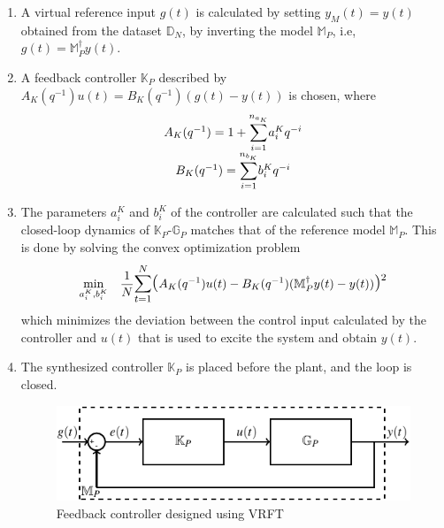 \documentclass[letterpaper, 10 pt, conference]{ieeeconf}  %
\begin{document}
\begin{enumerate}
	\item
	A virtual reference input $g(t)$ is calculated by setting $y_M(t)=y(t)$ obtained from the dataset $\mathbb{D}_N$, by inverting the model $\mathbb{M}_P$, i.e, $g(t) = \mathbb{M}_P^{\dagger}y(t) $.
	\item
	A feedback controller $\mathbb{K}_P$ described by $A_K(q^{-1})u(t) = B_K(q^{-1})(g(t)-y(t))$ is chosen, where 
	\begin{equation*}
	\begin{matrix}
	A_K(q^{-1}) = 1+\mathlarger{\sum\limits_{i=1}^{n_{a_K}}}a_i^Kq^{-i}\\
	B_K(q^{-1}) = \mathlarger{\sum\limits_{i=1}^{n_{b_K}}}b_i^Kq^{-i}
	\end{matrix}  
	\end{equation*}
	\item
		The parameters $a_i^K$ and $b_i^K$  of the controller are calculated such that the closed-loop dynamics of $\mathbb{K}_P$-$\mathbb{G}_P$ matches that of  the reference model $\mathbb{M}_P$.
	This is done by solving the convex optimization problem
	\begin{equation}
	\begin{aligned}
	& \underset{a_i^K,b_i^K}{\text{min}}
	& & \frac{1}{N}\mathlarger{\sum\limits_{t=1}^N}\mathlarger{\mathlarger{(}}A_K(q^{-1})u(t)-B_K(q^{-1})(\mathbb{M}_P^{\dagger}y(t)-y(t))\mathlarger{\mathlarger{)}}^2 \\
	\end{aligned}
	\label{VRFT_problem}
	\end{equation}
	which minimizes the deviation between the control input calculated by the controller and $u(t)$ that is used to excite the system and obtain $y(t)$.
	\item
	The synthesized controller $\mathbb{K}_P$ is placed before the plant, and the loop is closed.
	\begin{figure}[h]
		\hspace{30pt}
	\includegraphics[scale=0.8]{KpGp.pdf}
	\caption{Feedback controller designed using VRFT}
	\end{figure}
\end{enumerate}
\end{document}
